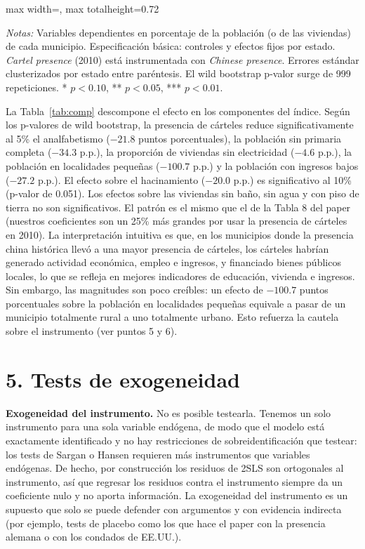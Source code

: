 \documentclass[11pt,a4paper]{article}
\newcommand{\tabla}[1]{\begin{adjustbox}{max width=\linewidth, max totalheight=0.72\textheight}\end{adjustbox}}
\newcommand{\notas}[1]{\par\vspace{0.3em}\begin{minipage}{0.92\linewidth}\footnotesize\textit{Notas:} #1\end{minipage}}
\begin{document}
\begin{table}[H]\centering
\caption{Presencia de cárteles y componentes del índice de marginación (2SLS)}\label{tab:comp}
\small
\tabla{"../output/Tabla 4.tex"}
\notas{Variables dependientes en porcentaje de la población (o de las viviendas) de cada municipio. Especificación básica: controles y efectos fijos por estado. \textit{Cartel presence} (2010) está instrumentada con \textit{Chinese presence}. Errores estándar clusterizados por estado entre paréntesis. El wild bootstrap p-valor surge de 999 repeticiones. * $p<0.10$, ** $p<0.05$, *** $p<0.01$.}
\end{table}

La Tabla~\ref{tab:comp} descompone el efecto en los componentes del índice. Según los p-valores de wild bootstrap, la presencia de cárteles reduce significativamente al 5\% el analfabetismo ($-21.8$ puntos porcentuales), la población sin primaria completa ($-34.3$ p.p.), la proporción de viviendas sin electricidad ($-4.6$ p.p.), la población en localidades pequeñas ($-100.7$ p.p.) y la población con ingresos bajos ($-27.2$ p.p.). El efecto sobre el hacinamiento ($-20.0$ p.p.) es significativo al 10\% (p-valor de 0.051). Los efectos sobre las viviendas sin baño, sin agua y con piso de tierra no son significativos. El patrón es el mismo que el de la Tabla 8 del paper (nuestros coeficientes son un 25\% más grandes por usar la presencia de cárteles en 2010). La interpretación intuitiva es que, en los municipios donde la presencia china histórica llevó a una mayor presencia de cárteles, los cárteles habrían generado actividad económica, empleo e ingresos, y financiado bienes públicos locales, lo que se refleja en mejores indicadores de educación, vivienda e ingresos. Sin embargo, las magnitudes son poco creíbles: un efecto de $-100.7$ puntos porcentuales sobre la población en localidades pequeñas equivale a pasar de un municipio totalmente rural a uno totalmente urbano. Esto refuerza la cautela sobre el instrumento (ver puntos 5 y 6).

\section*{5. Tests de exogeneidad}

\textbf{Exogeneidad del instrumento.} No es posible testearla. Tenemos un solo instrumento para una sola variable endógena, de modo que el modelo está exactamente identificado y no hay restricciones de sobreidentificación que testear: los tests de Sargan o Hansen requieren más instrumentos que variables endógenas. De hecho, por construcción los residuos de 2SLS son ortogonales al instrumento, así que regresar los residuos contra el instrumento siempre da un coeficiente nulo y no aporta información. La exogeneidad del instrumento es un supuesto que solo se puede defender con argumentos y con evidencia indirecta (por ejemplo, tests de placebo como los que hace el paper con la presencia alemana o con los condados de EE.UU.).
\end{document}
